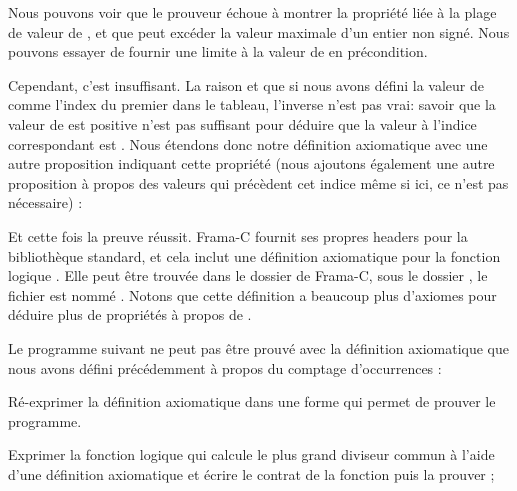 

Nous pouvons voir que le prouveur échoue à montrer la propriété liée à la
plage de valeur de , et que  peut excéder la
valeur maximale d'un entier non signé. Nous pouvons essayer de fournir une
limite à la valeur de  en précondition.




Cependant, c'est insuffisant. La raison et que si nous avons défini la
valeur de  comme l'index du premier
 dans le tableau, l'inverse n'est pas
vrai: savoir que la valeur de  est positive n'est
pas suffisant pour déduire que la valeur à l'indice correspondant est
. Nous étendons donc notre définition
axiomatique avec une autre proposition indiquant cette propriété (nous
ajoutons également une autre proposition à propos des valeurs qui
précèdent cet indice même si ici, ce n'est pas nécessaire) :





Et cette fois la preuve réussit. Frama-C fournit ses propres headers pour
la bibliothèque standard, et cela inclut une définition axiomatique pour
la fonction logique . Elle peut être trouvée dans le
dossier de Frama-C, sous le dossier , le fichier est
nommé . Notons que cette définition
a beaucoup plus d'axiomes pour déduire plus de propriétés à propos de
.








Le programme suivant ne peut pas être prouvé avec la définition axiomatique
que nous avons défini précédemment à propos du comptage d'occurrences :




Ré-exprimer la définition axiomatique dans une forme qui permet de prouver le
programme.




Exprimer la fonction logique qui calcule le plus grand diviseur commun à l'aide
d'une définition axiomatique et écrire le contrat de la fonction 
puis la prouver ;


